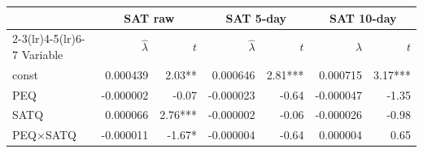 \begin{tabular}{lrrrrrr}
\toprule
& \multicolumn{2}{c}{SAT raw} & \multicolumn{2}{c}{SAT 5-day} & \multicolumn{2}{c}{SAT 10-day} \\
\cmidrule(lr){2-3}\cmidrule(lr){4-5}\cmidrule(lr){6-7}
Variable & $\hat{\lambda}$ & $t$ & $\hat{\lambda}$ & $t$ & $\hat{\lambda}$ & $t$ \\
\midrule
const & 0.000439 & 2.03** & 0.000646 & 2.81*** & 0.000715 & 3.17*** \\
PEQ & -0.000002 & -0.07 & -0.000023 & -0.64 & -0.000047 & -1.35 \\
SATQ & 0.000066 & 2.76*** & -0.000002 & -0.06 & -0.000026 & -0.98 \\
PEQ$\times$SATQ & -0.000011 & -1.67* & -0.000004 & -0.64 & 0.000004 & 0.65 \\
\bottomrule
\end{tabular}